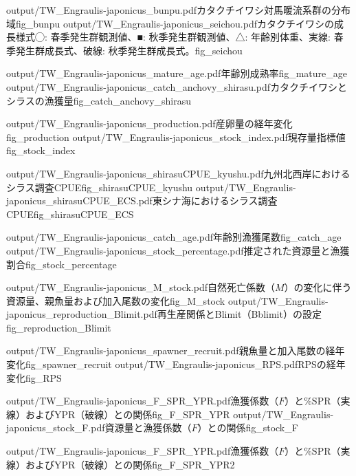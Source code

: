 \TwoOfSixFigs
{output/TW_Engraulis-japonicus_bunpu.pdf}{カタクチイワシ対馬暖流系群の分布域}{fig_bunpu}
{output/TW_Engraulis-japonicus_seichou.pdf}{カタクチイワシの成長様式\newline◯: 春季発生群観測値、■: 秋季発生群観測値、△: 年齢別体重、実線: 春季発生群成長式、破線: 秋季発生群成長式。}{fig_seichou}

\TwoOfSixFigs
{output/TW_Engraulis-japonicus_mature_age.pdf}{年齢別成熟率}{fig_mature_age}
{output/TW_Engraulis-japonicus_catch_anchovy_shirasu.pdf}{カタクチイワシとシラスの漁獲量}{fig_catch_anchovy_shirasu}

\TwoOfSixFigs
{output/TW_Engraulis-japonicus_production.pdf}{産卵量の経年変化}{fig_production}
{output/TW_Engraulis-japonicus_stock_index.pdf}{現存量指標値}{fig_stock_index}

\TwoOfSixFigs
{output/TW_Engraulis-japonicus_shirasuCPUE_kyushu.pdf}{九州北西岸におけるシラス調査CPUE}{fig_shirasuCPUE_kyushu}
{output/TW_Engraulis-japonicus_shirasuCPUE_ECS.pdf}{東シナ海におけるシラス調査CPUE}{fig_shirasuCPUE_ECS}

\TwoOfSixFigs
{output/TW_Engraulis-japonicus_catch_age.pdf}{年齢別漁獲尾数}{fig_catch_age}
{output/TW_Engraulis-japonicus_stock_percentage.pdf}{推定された資源量と漁獲割合}{fig_stock_percentage}

\TwoOfSixFigs
{output/TW_Engraulis-japonicus_M_stock.pdf}{自然死亡係数（$M$）の変化に伴う資源量、親魚量および加入尾数の変化}{fig_M_stock}
{output/TW_Engraulis-japonicus_reproduction_Blimit.pdf}{再生産関係とBlimit（Bblimit）の設定}{fig_reproduction_Blimit}

\TwoOfSixFigs
{output/TW_Engraulis-japonicus_spawner_recruit.pdf}{親魚量と加入尾数の経年変化}{fig_spawner_recruit}
{output/TW_Engraulis-japonicus_RPS.pdf}{RPSの経年変化}{fig_RPS}

\TwoOfSixFigs
{output/TW_Engraulis-japonicus_F_SPR_YPR.pdf}{漁獲係数（$F$）と\%SPR（実線）およびYPR（破線）との関係}{fig_F_SPR_YPR}
{output/TW_Engraulis-japonicus_stock_F.pdf}{資源量と漁獲係数（$F$）との関係}{fig_stock_F}

\OneOfSixFigs
{output/TW_Engraulis-japonicus_F_SPR_YPR.pdf}{漁獲係数（$F$）と\%SPR（実線）およびYPR（破線）との関係}{fig_F_SPR_YPR2}
